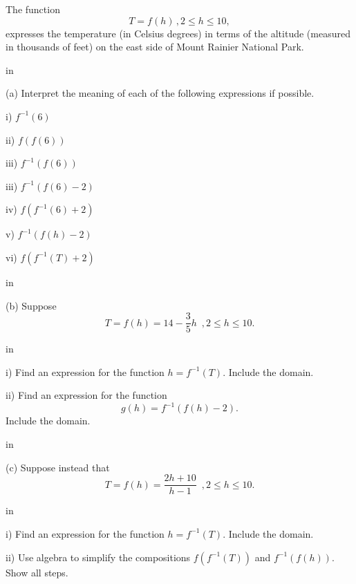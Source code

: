 \documentclass{ximera}
\newcommand{\pskip}{\vskip 0.1 in}
\begin{document}
\begin{example} \label{Ex15:Inverses}
The function
\[
   T = f(h) \, , 2\leq h \leq 10 ,
\]
expresses the temperature (in Celsius degrees) in terms of the altitude (measured in thousands of feet) on the east side of Mount Rainier National Park.

\pskip

(a) Interpret the meaning of each of the following expressions if possible.

i) $f^{-1}(6)$

ii) $f(f(6))$

iii) $f^{-1}(f(6))$

iii) $f^{-1}(f(6)-2)$

iv) $f(f^{-1}(6)+2)$

v) $f^{-1}(f(h)-2)$

vi) $f(f^{-1}(T)+2)$

\pskip

(b) Suppose 
\[
     T = f(h) = 14- \frac{3}{5} h \,\,\,  , 2\leq h \leq 10.
\]

\pskip

i) Find an expression for the function $h=f^{-1}(T)$. Include the domain.

ii) Find an expression for the function
\[
    g(h) = f^{-1}(f(h)-2).
\]  
Include the domain.

\pskip

(c) Suppose instead that
\[
   T = f(h) = \frac{2h+10}{h-1}  \,\,\,  , 2\leq h \leq 10.
\]

\pskip

i) Find an expression for the function $h=f^{-1}(T)$. Include the domain.

ii) Use algebra to simplify the compositions $f(f^{-1}(T))$ and $f^{-1}(f(h))$. Show all steps.

\end{example}
\end{document}
